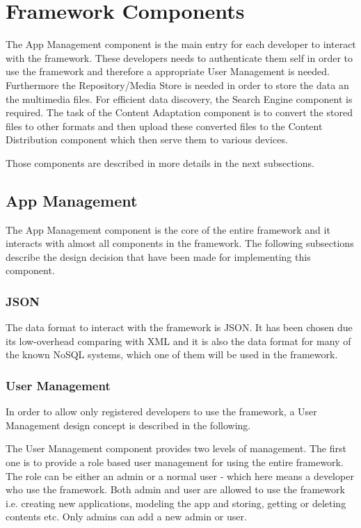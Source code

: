 \section{Framework Components\label{sec:des_com}}
The App Management component is the main entry for each developer to interact with the framework. These developers needs to authenticate them self in order to use the framework and therefore a appropriate User Management is needed. Furthermore the Repository/Media Store is needed in order to store the data an the multimedia files. For efficient data discovery, the Search Engine component  is required. The task of the Content Adaptation component is to convert the stored files to other formats and then upload these converted files to the Content Distribution component which then serve them to various devices.

Those components are described in more details in the next subsections.
 
\subsection{App Management\label{sec:des_repo}}

The App Management component is the core of the entire framework and it interacts with almost all components in the framework. The following subsections describe the design decision that have been made for implementing this component.

\subsubsection{JSON}
The data format to interact with the framework is JSON. It has been chosen due its low-overhead comparing with XML and it is also the data format for many of the known NoSQL systems, which one of them will be used in the framework.
 
\subsubsection{User Management \label{sec:des_user_man}}
In order to allow only registered developers to use the framework, a User Management design concept is described in the following.

The User Management component provides two levels of management. The first one is to provide a role based user management for using the entire framework. The role can be either an admin or a normal user - which here means a developer who use the framework. Both admin and user are allowed to use the framework i.e. creating new applications, modeling the app and storing, getting or deleting contents etc. Only admins can add a new admin or user.

